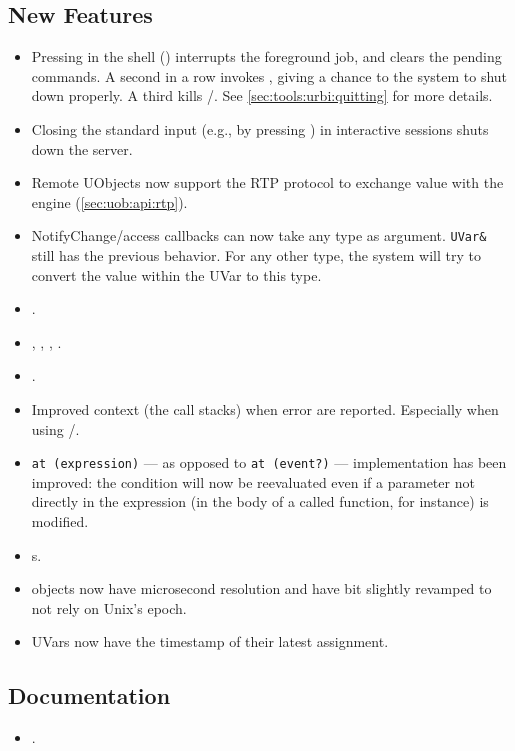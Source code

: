 \subsection{New Features}
\begin{itemize}
\item Pressing  in the \us shell () interrupts the
  foreground job, and clears the pending commands.  A second  in a
  row invokes , giving a chance to the system to
  shut down properly.  A third  kills
  /.  See
  \autoref{sec:tools:urbi:quitting} for more details.
\item Closing the standard input (e.g., by pressing ) in
  interactive sessions shuts down the server.
\item Remote UObjects now support the RTP protocol to exchange value with
  the engine (\autoref{sec:uob:api:rtp}).
\item NotifyChange/access callbacks can now take any type as argument.
  \lstinline|UVar&| still has the previous behavior. For any other type,
  the system will try to convert the value within the UVar to this type.
\item {}.
\item {}, , ,
  .
\item {}.
\item Improved context (the call stacks) when error are reported.
  Especially when using /.
\item \lstinline|at (expression)| --- as opposed to \lstinline|at (event?)| ---
  implementation has been improved: the condition will now be reevaluated even
  if a parameter not directly in the expression (in the body of a called
  function, for instance) is modified.
\item {}s.
\item {} objects now have microsecond resolution and
  have bit slightly revamped to not rely on Unix's epoch.
\item UVars now have the timestamp of their latest assignment.
\end{itemize}

\subsection{Documentation}
\begin{itemize}
\item {}.
\end{itemize}

